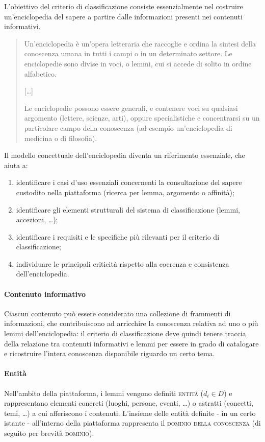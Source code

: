 L'obiettivo del criterio di classificazione consiste essenzialmente nel costruire un'enciclopedia del sapere a partire dalle informazioni presenti nei contenuti informativi.

\begin{quotation}
Un'enciclopedia è un'opera letteraria che raccoglie e ordina la sintesi della conoscenza umana in tutti i campi o in un determinato settore. Le enciclopedie sono divise in voci, o lemmi, cui si accede di solito in ordine alfabetico.
\begin{center}[\ldots]\end{center}
Le enciclopedie possono essere generali, e contenere voci su qualsiasi argomento (lettere, scienze, arti), oppure specialistiche e concentrarsi su un particolare campo della conoscenza (ad esempio un'enciclopedia di medicina o di filosofia). \cite{wiki:enciclopedia}
\end{quotation}

Il modello concettuale dell'enciclopedia diventa un riferimento essenziale, che aiuta a:
\begin{enumerate}
	\item identificare i casi d'uso essenziali concernenti la consultazione del sapere custodito nella piattaforma (ricerca per lemma, argomento o affinità);
	\item identificare gli elementi strutturali del sistema di classificazione (lemmi, accezioni, \ldots);
	\item identificare i requisiti e le specifiche più rilevanti per il criterio di classificazione;
	\item individuare le principali criticità rispetto alla coerenza e consistenza dell'enciclopedia.
\end{enumerate}

\paragraph{Contenuto informativo}
Ciascun contenuto può essere considerato una collezione di frammenti di informazioni, che contribuiscono ad arricchire la conoscenza relativa ad uno o più lemmi dell'enciclopedia: il criterio di classificazione deve quindi tenere traccia della relazione tra contenuti informativi e lemmi per essere in grado di catalogare e ricostruire l'intera conoscenza disponibile riguardo un certo tema.

\paragraph{Entità}
Nell'ambito della piattaforma, i lemmi vengono definiti \textsc{entità} ($d_i \in D$) e rappresentano elementi concreti (luoghi, persone, eventi, \ldots) o astratti (concetti, temi, \ldots) a cui afferiscono i contenuti. L'insieme delle entità definite - in un certo istante - all'interno della piattaforma rappresenta il \textsc{dominio della conoscenza} (di seguito per brevità \textsc{dominio}).

